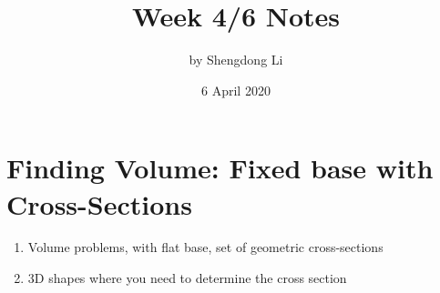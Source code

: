 \documentclass[letterpaper, 12pt]{article}
\begin{document}
\title{Week 4/6 Notes}
\author{by Shengdong Li}
\date{6 April 2020}
\maketitle

\section{Finding Volume: Fixed base with Cross-Sections}
\begin{enumerate}
    \item Volume problems, with flat base, set of geometric cross-sections
    \item 3D shapes where you need to determine the cross section
\end{enumerate}
\end{document}
